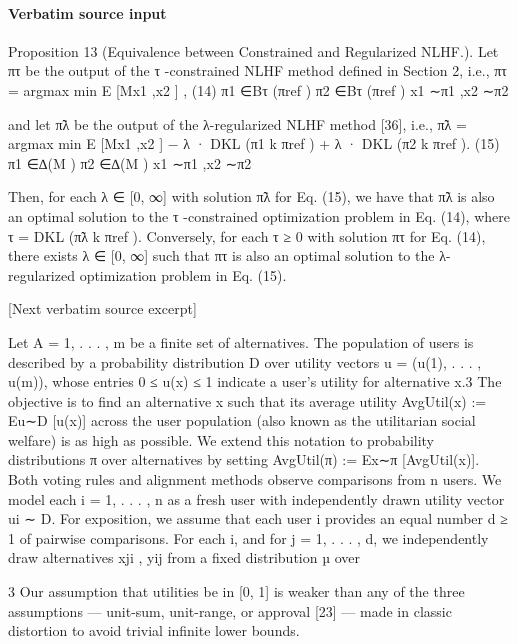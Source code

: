 \documentclass[10pt]{article}
\begin{document}
\paragraph{Verbatim source input}
\begin{ReviewVerbatim}
Proposition 13 (Equivalence between Constrained and Regularized NLHF.). Let πτ be the output of
the τ -constrained NLHF method defined in Section 2, i.e.,
                                πτ = argmax                 min               E          [Mx1 ,x2 ] ,                         (14)
                                         π1 ∈Bτ (πref ) π2 ∈Bτ (πref ) x1 ∼π1 ,x2 ∼π2

and let π̃λ be the output of the λ-regularized NLHF method [36], i.e.,
      π̃λ = argmax          min             E         [Mx1 ,x2 ] − λ · DKL (π1 k πref ) + λ · DKL (π2 k πref ).               (15)
            π1 ∈∆(M ) π2 ∈∆(M ) x1 ∼π1 ,x2 ∼π2

Then, for each λ ∈ [0, ∞] with solution π̃λ for Eq. (15), we have that π̃λ is also an optimal solution
to the τ -constrained optimization problem in Eq. (14), where τ = DKL (π̃λ k πref ). Conversely, for
each τ ≥ 0 with solution πτ for Eq. (14), there exists λ ∈ [0, ∞] such that πτ is also an optimal
solution to the λ-regularized optimization problem in Eq. (15).

[Next verbatim source excerpt]

Let A = {1, . . . , m} be a finite set of alternatives. The population of users is described by a
probability distribution D over utility vectors u = (u(1), . . . , u(m)), whose entries 0 ≤ u(x) ≤ 1
indicate a user’s utility for alternative x.3 The objective is to find an alternative x such that its average
utility AvgUtil(x) := Eu∼D [u(x)] across the user population (also known as the utilitarian social
welfare) is as high as possible. We extend this notation to probability distributions π over alternatives
by setting AvgUtil(π) := Ex∼π [AvgUtil(x)].
Both voting rules and alignment methods observe comparisons from n users. We model each
i = 1, . . . , n as a fresh user with independently drawn utility vector ui ∼ D. For exposition, we
assume that each user i provides an equal number d ≥ 1 of pairwise comparisons. For each i,
and for j = 1, . . . , d, we independently draw alternatives xji , yij from a fixed distribution µ over

    3
     Our assumption that utilities be in [0, 1] is weaker than any of the three assumptions — unit-sum, unit-range,
or approval [23] — made in classic distortion to avoid trivial infinite lower bounds.



\end{ReviewVerbatim}
\end{document}
